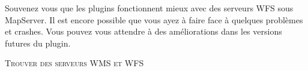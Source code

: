 Souvenez vous que les plugins fonctionnent mieux avec des serveurs WFS sous
MapServer. Il est encore possible que vous ayez à faire face à quelques
problèmes et crashes. Vous pouvez vous attendre à des améliorations dans les
versions futures du plugin.

\begin{Tip}[ht]\caption{\textsc{Trouver des serveurs WMS et WFS}}
\end{Tip}